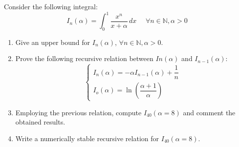 \documentclass[12pt, a4paper]{report}
\newtheorem[style=M,bodystyle=\normalfont]{theorem}{Theorem}
\newtheorem[style=M,bodystyle=\normalfont]{corollary}{Corollary}
\newtheorem[style=M,bodystyle=\normalfont]{lemma}{Lemma}
\newtheorem[style=M,bodystyle=\normalfont]{definition}{Definition}
\begin{document}
    \newpage

    \begin{Exercise}[label=12]
        Consider the following integral: 
        \[I_n(\alpha)=\int_{0}^{1} \dfrac{x^n}{x+\alpha} \,dx \:\:\:\:\:\: \forall n \in \mathbb{N},\alpha>0\]
        \begin{enumerate}
            \item Give an upper bound for $I_n(\alpha)$, $\forall n \in \mathbb{N}, \alpha > 0$.
            \item Prove the following recursive relation between $In(\alpha)$ and $I_{n-1}(\alpha)$:
            \[
                \begin{cases}
                    I_n(\alpha)=-\alpha I_{n-1}(\alpha)+\dfrac{1}{n} \\
                    I_o(\alpha)=\ln{\left( \dfrac{\alpha + 1}{\alpha} \right)}
                \end{cases}
            \]
            \item Employing the previous relation, compute $I_40(\alpha = 8)$ and comment the obtained results. 
            \item Write a numerically stable recursive relation for $I_40(\alpha = 8)$.
        \end{enumerate}
    \end{Exercise}
\end{document}
